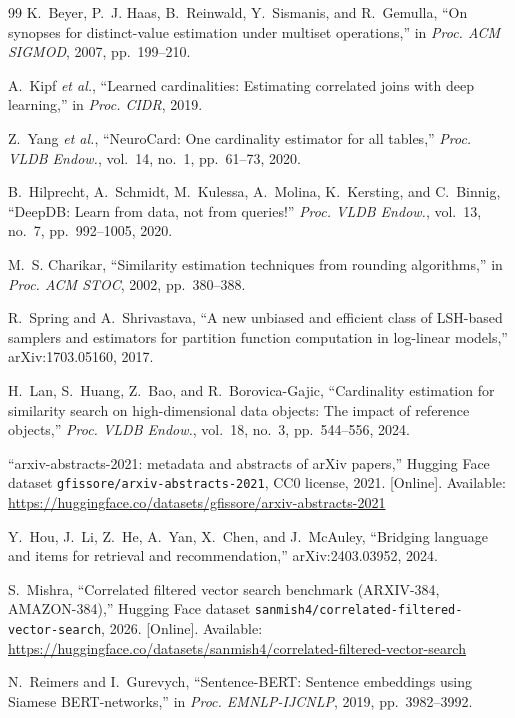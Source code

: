 \documentclass[sigconf,nonacm]{acmart}
\begin{document}
\begin{thebibliography}{99}
K.~Beyer, P.~J. Haas, B.~Reinwald, Y.~Sismanis, and R.~Gemulla, ``On synopses for distinct-value estimation under multiset operations,'' in \emph{Proc. ACM SIGMOD}, 2007, pp.~199--210.

A.~Kipf \emph{et al.}, ``Learned cardinalities: Estimating correlated joins with deep learning,'' in \emph{Proc. CIDR}, 2019.

Z.~Yang \emph{et al.}, ``NeuroCard: One cardinality estimator for all tables,'' \emph{Proc. VLDB Endow.}, vol.~14, no.~1, pp.~61--73, 2020.

B.~Hilprecht, A.~Schmidt, M.~Kulessa, A.~Molina, K.~Kersting, and C.~Binnig, ``DeepDB: Learn from data, not from queries!'' \emph{Proc. VLDB Endow.}, vol.~13, no.~7, pp.~992--1005, 2020.

M.~S. Charikar, ``Similarity estimation techniques from rounding algorithms,'' in \emph{Proc. ACM STOC}, 2002, pp.~380--388.

R.~Spring and A.~Shrivastava, ``A new unbiased and efficient class of LSH-based samplers and estimators for partition function computation in log-linear models,'' arXiv:1703.05160, 2017.

H.~Lan, S.~Huang, Z.~Bao, and R.~Borovica-Gajic, ``Cardinality estimation for similarity search on high-dimensional data objects: The impact of reference objects,'' \emph{Proc. VLDB Endow.}, vol.~18, no.~3, pp.~544--556, 2024.

``arxiv-abstracts-2021: metadata and abstracts of arXiv papers,'' Hugging Face dataset \texttt{gfissore/arxiv-abstracts-2021}, CC0 license, 2021. [Online]. Available: \url{https://huggingface.co/datasets/gfissore/arxiv-abstracts-2021}

Y.~Hou, J.~Li, Z.~He, A.~Yan, X.~Chen, and J.~McAuley, ``Bridging language and items for retrieval and recommendation,'' arXiv:2403.03952, 2024.

S.~Mishra, ``Correlated filtered vector search benchmark (ARXIV-384, AMAZON-384),'' Hugging Face dataset \texttt{sanmish4/correlated-filtered-vector-search}, 2026. [Online]. Available: \url{https://huggingface.co/datasets/sanmish4/correlated-filtered-vector-search}

N.~Reimers and I.~Gurevych, ``Sentence-BERT: Sentence embeddings using Siamese BERT-networks,'' in \emph{Proc. EMNLP-IJCNLP}, 2019, pp.~3982--3992.

\end{thebibliography}
\end{document}
